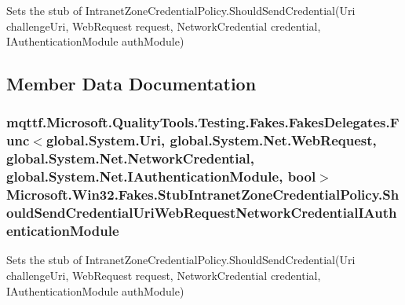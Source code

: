 Sets the stub of Intranet\-Zone\-Credential\-Policy.\-Should\-Send\-Credential(\-Uri challenge\-Uri, Web\-Request request, Network\-Credential credential, I\-Authentication\-Module auth\-Module)



\subsection{Member Data Documentation}
\hypertarget{class_microsoft_1_1_win32_1_1_fakes_1_1_stub_intranet_zone_credential_policy_ab0e54738c8e9482afae00e7cf8c4b731}{
\subsubsection[{Should\-Send\-Credential\-Uri\-Web\-Request\-Network\-Credential\-I\-Authentication\-Module}]{\setlength{\rightskip}{0pt plus 5cm}mqttf.\-Microsoft.\-Quality\-Tools.\-Testing.\-Fakes.\-Fakes\-Delegates.\-Func$<$global.\-System.\-Uri, global.\-System.\-Net.\-Web\-Request, global.\-System.\-Net.\-Network\-Credential, global.\-System.\-Net.\-I\-Authentication\-Module, bool$>$ Microsoft.\-Win32.\-Fakes.\-Stub\-Intranet\-Zone\-Credential\-Policy.\-Should\-Send\-Credential\-Uri\-Web\-Request\-Network\-Credential\-I\-Authentication\-Module}}\label{class_microsoft_1_1_win32_1_1_fakes_1_1_stub_intranet_zone_credential_policy_ab0e54738c8e9482afae00e7cf8c4b731}


Sets the stub of Intranet\-Zone\-Credential\-Policy.\-Should\-Send\-Credential(\-Uri challenge\-Uri, Web\-Request request, Network\-Credential credential, I\-Authentication\-Module auth\-Module)



